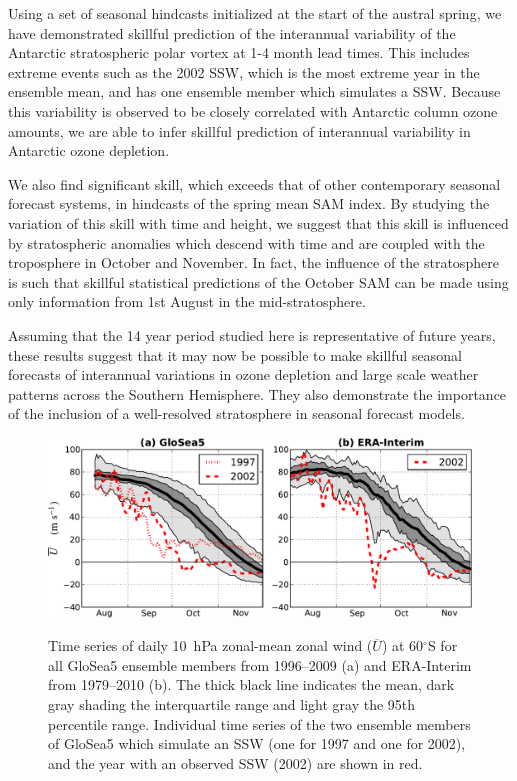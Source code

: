 Using a set of seasonal hindcasts initialized at the start of the austral spring, we have demonstrated skillful prediction of the interannual variability of the Antarctic stratospheric polar vortex at 1-4 month lead times. This includes extreme events such as the 2002 SSW, which is the most extreme year in the ensemble mean, and has one ensemble member which simulates a SSW. Because this variability is observed to be closely correlated with Antarctic column ozone amounts, we are able to infer skillful prediction of interannual variability in Antarctic ozone depletion. 

We also find significant skill, which exceeds that of other contemporary seasonal forecast systems, in hindcasts of the spring mean SAM index.  By studying the variation of this skill with time and height, we suggest that this skill is influenced by stratospheric anomalies which descend with time and are coupled with the troposphere in October and November. In fact, the influence of the stratosphere is such that skillful statistical predictions of the October SAM can be made using only information from 1st August in the mid-stratosphere. 

Assuming that the 14 year period studied here is representative of future years, these results suggest that it may now be possible to make skillful seasonal forecasts of interannual variations in ozone depletion and large scale weather patterns across the Southern Hemisphere. They also demonstrate the importance of the inclusion of a well-resolved stratosphere in seasonal forecast models.

\begin{figure}[t]
  \noindent\includegraphics[width=\textwidth,angle=0]{figures/GloSea5/zmzw_climatologies_crop.pdf}\\
  \caption[Comparison of GloSea5 and ERA-Interim zonal-mean zonal wind climatologies.]{Time series of daily 10~hPa zonal-mean zonal wind ($\overline{U}$) at 60$^{\circ}$S for all GloSea5 ensemble members from 1996--2009 (a) and ERA-Interim from 1979--2010 (b). The thick black line indicates the mean, dark gray shading the interquartile range and light gray the 95th percentile range. Individual time series of the two ensemble members of GloSea5 which simulate an SSW (one for 1997 and one for 2002), and the year with an observed SSW (2002) are shown in red.}\label{Fig1}
\end{figure}

